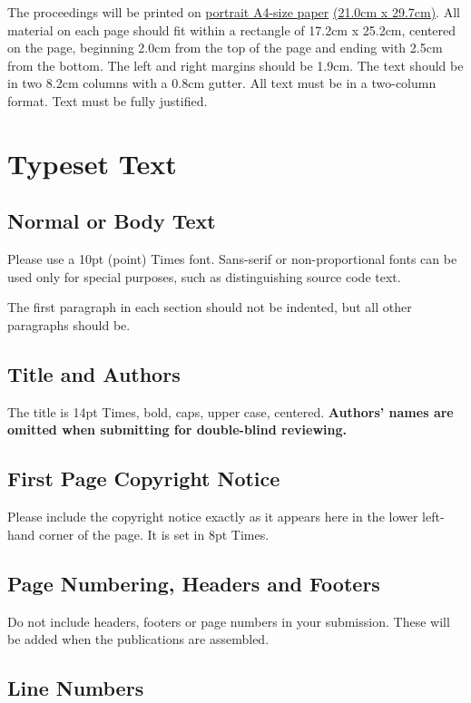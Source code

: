 \documentclass{article}
\begin{document}
The proceedings will be printed on \underline{portrait A4-size paper} \underline{(21.0cm x 29.7cm)}. All material on each page should fit within a rectangle of 17.2cm x 25.2cm, centered on the page, beginning 2.0cm from the top of the page and ending with 2.5cm from the bottom. The left and right margins should be 1.9cm. The text should be in two 8.2cm columns with a 0.8cm gutter. All text must be in a two-column format. Text must be fully justified.

\section{Typeset Text}\label{sec:typeset_text}

\subsection{Normal or Body Text}\label{subsec:body}

Please use a 10pt (point) Times font. Sans-serif or non-proportional fonts can be used only for special purposes, such as distinguishing source code text.

The first paragraph in each section should not be indented, but all other paragraphs should be.

\subsection{Title and Authors}

The title is 14pt Times, bold, caps, upper case, centered. \textbf{Authors' names are omitted when submitting for double-blind reviewing.}

\subsection{First Page Copyright Notice}

Please include the copyright notice exactly as it appears here in the lower left-hand corner of the page. It is set in 8pt Times.


\subsection{Page Numbering, Headers and Footers}

Do not include headers, footers or page numbers in your submission. These will be added when the publications are assembled.

\subsection{Line Numbers}
\end{document}

